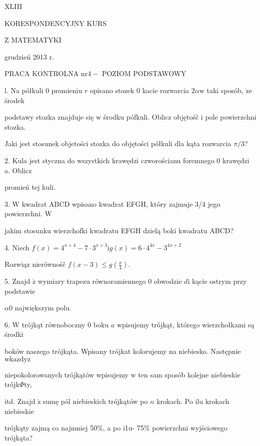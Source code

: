 \documentclass[a4paper,12pt]{article}
\begin{document}
XLIII

KORESPONDENCYJNY KURS

Z MATEMATYKI

grudzień 2013 r.

PRACA KONTROLNA $\mathrm{n}\mathrm{r} 4-$ POZIOM PODSTAWOWY

l. Na półkuli $0$ promieniu $r$ opisano stozek $0$ kacie rozwarcia $2\alpha \mathrm{w}$ taki sposób, $\dot{\mathrm{z}}\mathrm{e}$ środek

podstawy stozka znajduje się $\mathrm{w}$ środku pófkuli. Oblicz objętośč $\mathrm{i}$ pole powierzchni stozka.

Jaki jest stosunek objetości stozka do objętości półkuli dla kąta rozwarcia $\pi/3$?

2. Kula jest styczna do wszystkich krawędzi czworościanu foremnego 0 krawędzi a. Oblicz

promień tej kuli.

3. $\mathrm{W}$ kwadrat ABCD wpisano kwadrat EFGH, który zajmuje 3/4 jego powierzchni. $\mathrm{W}$

jakim stosunku wierzchofki kwadratu EFGH dzielą boki kwadratu ABCD?

4. Niech $f(x)=4^{x+4}-7\cdot 3^{x+3}\mathrm{i}g(x)=6\cdot 4^{4x}-3^{4x+2}$

Rozwiąz nierównośč $f(x-3)\displaystyle \leq g(\frac{x}{4}).$

5. Znajd $\acute{\mathrm{z}}$ wymiary trapezu równoramiennego $0$ obwodzie $d\mathrm{i}$ kącie ostrym przy podstawie

$\alpha 0$ największym polu.

6. $\mathrm{W}$ trójkąt równoboczny $0$ boku $a$ wpisujemy trójkąt, którego wierzchołkami są środki

boków naszego trójkąta. Wpisany trójkat kolorujemy na niebiesko. Następnie $\mathrm{w}\mathrm{k}\mathrm{a}\dot{\mathrm{z}}\mathrm{d}\mathrm{y}\mathrm{z}$

niepokolorowanych trójkątów wpisujemy $\mathrm{w}$ ten sam sposób kolejne niebieskie trójk$\Phi$ty,

itd. Znajd $\acute{\mathrm{z}}$ sumę pól niebieskich trójkątów po $n$ krokach. Po ilu krokach niebieskie

trójkąty zajmą co najmniej 50\%, a po i1u- 75\% powierzchni wyjściowego trójkąta?
\end{document}
